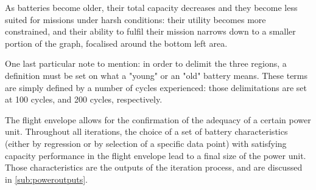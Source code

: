 As batteries become older, their total capacity decreases and they become less suited for missions under harsh conditions: their utility becomes more constrained, and their ability to fulfil their mission narrows down to a smaller portion of the graph, focalised around the bottom left area.

One last particular note to mention: in order to delimit the three regions, a definition must be set on what a "young" or an "old" battery means. These terms are simply defined by a number of cycles experienced: those delimitations are set at 100 cycles, and 200 cycles, respectively.

The flight envelope allows for the confirmation of the adequacy of a certain power unit. Throughout all iterations, the choice of a set of battery characteristics (either by regression or by selection of a specific data point) with satisfying capacity performance in the flight envelope lead to a final size of the power unit. Those characteristics are the outputs of the iteration process, and are discussed in \autoref{sub:poweroutputs}.





